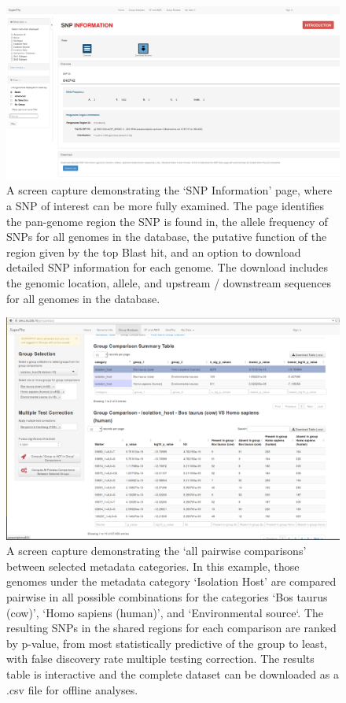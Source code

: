 \documentclass[doublespacing, linenumbers]{bmcart}
\begin{document}
\begin{backmatter}
\begin{landscape}
\newpage
\begin{figure}[h!]
  \includegraphics[width=1\columnwidth]{images/snp_info_page.png}
  \caption{A screen capture demonstrating the `SNP Information' page, where a SNP of interest can be more fully examined. The page identifies the pan-genome region the SNP is found in, the allele frequency of SNPs for all genomes in the database, the putative function of the region given by the top Blast hit, and an option to download detailed SNP information for each genome. The download includes the genomic location, allele, and upstream / downstream sequences for all genomes in the database. }
  \label{fig:snp_info}
 \end{figure}

\newpage
\begin{figure}[h!]
  \includegraphics[width=0.9\columnwidth]{images/gc_fet_multiple_groups.png}
  \caption{A screen capture demonstrating the `all pairwise comparisons' between selected metadata categories. In this example, those genomes under the metadata category `Isolation Host' are compared pairwise in all possible combinations for the categories `Bos taurus (cow)', `Homo sapiens (human)', and `Environmental source`. The resulting SNPs in the shared regions for each comparison are ranked by p-value, from most statistically predictive of the group to least, with false discovery rate multiple testing correction. The results table is interactive and the complete dataset can be downloaded as a .csv file for offline analyses.}
 \label{fig:fet_multiple_groups}
\end{figure}
\end{landscape}


\end{backmatter}
\end{document}
